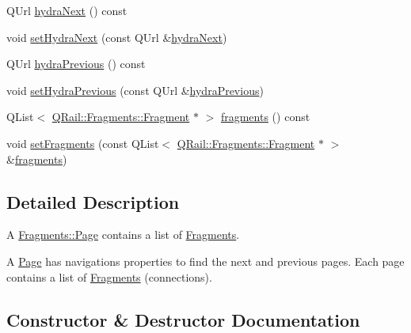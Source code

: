 \begin{DoxyCompactItemize}
\item 
Q\+Url \mbox{\hyperlink{classQRail_1_1Fragments_1_1Page_abac5d1c1b6bc72623725ac9585ed1a86}{hydra\+Next}} () const
\item 
void \mbox{\hyperlink{classQRail_1_1Fragments_1_1Page_a91fb6b3858cf55f4f3839837f55784a0}{set\+Hydra\+Next}} (const Q\+Url \&\mbox{\hyperlink{classQRail_1_1Fragments_1_1Page_abac5d1c1b6bc72623725ac9585ed1a86}{hydra\+Next}})
\item 
Q\+Url \mbox{\hyperlink{classQRail_1_1Fragments_1_1Page_abd9b826a513ec4f7ca3803cd52678596}{hydra\+Previous}} () const
\item 
void \mbox{\hyperlink{classQRail_1_1Fragments_1_1Page_ad5744b16116e8fc0d7781e45b54a49e9}{set\+Hydra\+Previous}} (const Q\+Url \&\mbox{\hyperlink{classQRail_1_1Fragments_1_1Page_abd9b826a513ec4f7ca3803cd52678596}{hydra\+Previous}})
\item 
Q\+List$<$ \mbox{\hyperlink{classQRail_1_1Fragments_1_1Fragment}{Q\+Rail\+::\+Fragments\+::\+Fragment}} $\ast$ $>$ \mbox{\hyperlink{classQRail_1_1Fragments_1_1Page_a24f93fc23c2f2795fc3d662aed48c7d9}{fragments}} () const
\item 
void \mbox{\hyperlink{classQRail_1_1Fragments_1_1Page_a0d779fadca796cc40cba14a27f0d141e}{set\+Fragments}} (const Q\+List$<$ \mbox{\hyperlink{classQRail_1_1Fragments_1_1Fragment}{Q\+Rail\+::\+Fragments\+::\+Fragment}} $\ast$ $>$ \&\mbox{\hyperlink{classQRail_1_1Fragments_1_1Page_a24f93fc23c2f2795fc3d662aed48c7d9}{fragments}})
\end{DoxyCompactItemize}


\subsection{Detailed Description}
A \mbox{\hyperlink{classQRail_1_1Fragments_1_1Page}{Fragments\+::\+Page}} contains a list of \mbox{\hyperlink{namespaceQRail_1_1Fragments}{Fragments}}. 

A \mbox{\hyperlink{classQRail_1_1Fragments_1_1Page}{Page}} has navigations properties to find the next and previous pages. Each page contains a list of \mbox{\hyperlink{namespaceQRail_1_1Fragments}{Fragments}} (connections). 

\subsection{Constructor \& Destructor Documentation}
\mbox{\label{classQRail_1_1Fragments_1_1Page_ad674b8b6a51f72b955128f03f92f7927}} 
